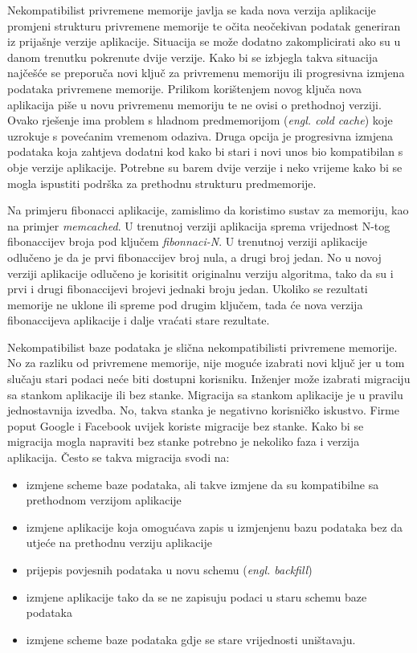 Nekompatibilist privremene memorije javlja se kada nova verzija aplikacije promjeni strukturu
privremene memorije te očita neočekivan podatak generiran iz prijašnje verzije aplikacije. Situacija
se može dodatno zakomplicirati ako su u danom trenutku pokrenute dvije verzije. Kako bi se izbjegla
takva situacija najčešće se preporuča novi ključ za privremenu memoriju ili progresivna izmjena
podataka privremene memorije. Prilikom korištenjem novog ključa nova aplikacija piše u novu
privremenu memoriju te ne ovisi o prethodnoj verziji. Ovako rješenje ima problem s hladnom
predmemorijom (\textit{engl. cold cache}) koje uzrokuje s povećanim vremenom odaziva. Druga opcija
je progresivna izmjena podataka koja zahtjeva dodatni kod kako bi stari i novi unos bio kompatibilan
s obje verzije aplikacije. Potrebne su barem dvije verzije i neko vrijeme kako bi se mogla ispustiti
podrška za prethodnu strukturu predmemorije.

Na primjeru fibonacci aplikacije, zamislimo da koristimo sustav za memoriju, kao na primjer
\textit{memcached}. U trenutnoj verziji aplikacija sprema vrijednost N-tog fibonaccijev broja pod
ključem \textit{fibonnaci-N}. U trenutnoj verziji aplikacije odlučeno je da je prvi fibonaccijev
broj nula, a drugi broj jedan. No u novoj verziji aplikacije odlučeno je korisitit originalnu
verziju algoritma, tako da su i prvi i drugi fibonaccijevi brojevi jednaki broju jedan. Ukoliko se
rezultati memorije ne uklone ili spreme pod drugim ključem, tada će nova verzija fibonaccijeva
aplikacije i dalje vraćati stare rezultate.

Nekompatibilist baze podataka je slična nekompatibilisti privremene memorije. No za razliku od
privremene memorije, nije moguće izabrati novi ključ jer u tom slučaju stari podaci neće biti
dostupni korisniku. Inženjer može izabrati migraciju sa stankom aplikacije ili bez stanke. Migracija
sa stankom aplikacije je u pravilu jednostavnija izvedba. No, takva stanka je negativno korisničko
iskustvo. Firme poput Google i Facebook uvijek koriste migracije bez stanke. Kako bi se migracija
mogla napraviti bez stanke potrebno je nekoliko faza i verzija aplikacija. Često se takva migracija
svodi na:
\begin{itemize}
    \item izmjene scheme baze podataka, ali takve izmjene da su kompatibilne sa prethodnom verzijom
        aplikacije
    \item izmjene aplikacije koja omogućava zapis u izmjenjenu bazu podataka bez da utjeće na
        prethodnu verziju aplikacije
    \item prijepis povjesnih podataka u novu schemu (\textit{engl. backfill})
    \item izmjene aplikacije tako da se ne zapisuju podaci u staru schemu baze podataka
    \item izmjene scheme baze podataka gdje se stare vrijednosti uništavaju.
\end{itemize}

